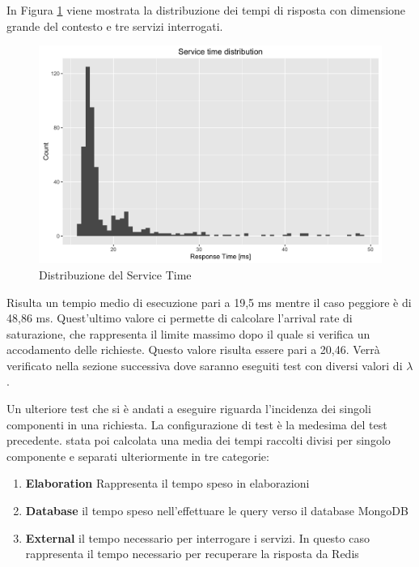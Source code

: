In Figura \ref{fig:service-time-distribution} viene mostrata la distribuzione dei tempi di risposta con dimensione grande del contesto e tre servizi interrogati.

\begin{figure}[ht]
	\centering
	\includegraphics[width=\textwidth]{7-performance/Immagini/service_time_distribution.png}
	\caption{Distribuzione del Service Time}\label{fig:service-time-distribution}
\end{figure}

Risulta un tempio medio di esecuzione pari a 19,5 ms mentre il caso peggiore è di 48,86 ms. Quest'ultimo valore ci permette di calcolare l'arrival rate di saturazione, che rappresenta il limite massimo dopo il quale si verifica un accodamento delle richieste. Questo valore risulta essere pari a 20,46. Verrà verificato nella sezione successiva dove saranno eseguiti test con diversi valori di $ \lambda $.

Un ulteriore test che si è andati a eseguire riguarda l'incidenza dei singoli componenti in una richiesta. La configurazione di test è la medesima del test precedente. \upe stata poi calcolata una media dei tempi raccolti divisi per singolo componente e separati ulteriormente in tre categorie:

\begin{enumerate}
	\item \textbf{Elaboration}
	Rappresenta il tempo speso in elaborazioni
	\item \textbf{Database}
	\upe il tempo speso nell'effettuare le query verso il database MongoDB
	\item \textbf{External}
	\upe il tempo necessario per interrogare i servizi. In questo caso rappresenta il tempo necessario per recuperare la risposta da Redis
\end{enumerate}

